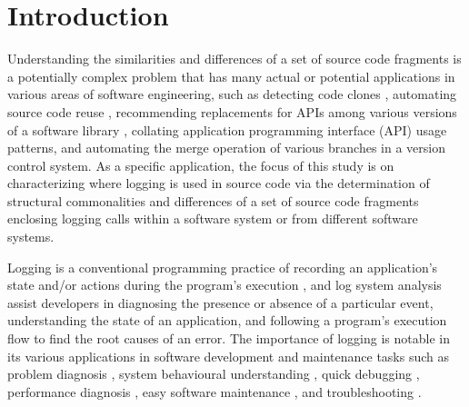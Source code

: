 \chapter{Introduction}  \label{Introduction}

Understanding the similarities and differences of a set of source code fragments is a potentially complex problem that has many actual or potential applications in various areas of software engineering, such as detecting code clones \cite{bulychev2009evaluation}, automating source code reuse \cite{2008:fse:cottrell}, recommending replacements for APIs among various versions of a software library \cite{2014:uofc:cossette}, collating application programming interface (API) usage patterns, and automating the merge operation of various branches in a version control system. As a specific application, the focus of this study is on characterizing where logging is used in source code via the determination of structural commonalities and differences of a set of source code fragments enclosing logging calls within a software system or from different software systems.

Logging is a conventional programming practice of recording an application's state and/or actions during the program's execution \cite{gupta2005pro}, and log system analysis assist developers in diagnosing the presence or absence of a particular event, understanding the state of an application, and following a program's execution flow to find the root causes of an error. The importance of logging is notable in its various applications in software development and maintenance tasks such as problem diagnosis \cite{lou2010mining}, system behavioural understanding \cite{fu2013contextual}, quick debugging \cite{gupta2005pro}, performance diagnosis \cite{nagaraj2012structured}, easy software maintenance \cite{gupta2005pro}, and troubleshooting \cite{fu2009execution}.

